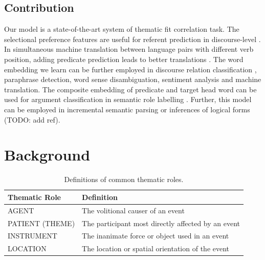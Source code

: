 \documentclass[a4paper]{article}
\begin{document}
\subsection{Contribution} \label{sec:contribution}
Our model is a state-of-the-art system of thematic fit correlation task. The selectional preference features are useful for referent prediction in discourse-level \citep{modi2017modeling}. In simultaneous machine translation between language pairs with different verb position, adding predicate prediction leads to better translations \citep{grissom2014don}. The word embedding we learn can be further employed in discourse relation classification \citep{shi2017need, rutherford2017systematic}, paraphrase detection, word sense disambiguation, sentiment analysis and machine translation. The composite embedding of predicate and target head word can be used for argument classification in semantic role labelling \citep{roth2016neural}. Further, this model can be employed in incremental semantic parsing \citep{konstas2014incremental, konstas2015semantic} or inferences of logical forms (TODO: add ref). 



\newpage
\section{Background}


\begin{table}[t]
\centering
\begin{tabular}{l|l}
\textbf{Thematic Role}  &   \textbf{Definition} \\ \hline
AGENT                   &   The volitional causer of an event \\
PATIENT (THEME)         &   The participant most directly affected by an event \\
INSTRUMENT              &   The inanimate force or object used in an event \\
LOCATION                &   The location or spatial orientation of the event \\
\end{tabular}
\caption{\label{tab:thematic} Definitions of common thematic roles.}
\end{table}
\end{document}
